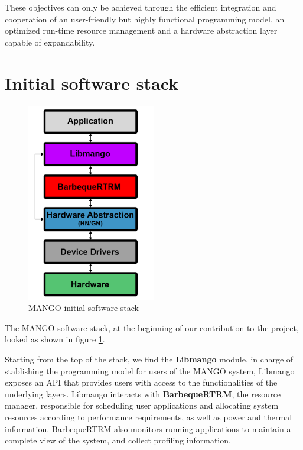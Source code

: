 These objectives can only be achieved through the efficient integration and cooperation of an user-friendly but highly functional programming model, an optimized run-time resource management and a hardware abstraction layer capable of expandability.

\section{Initial software stack}

\begin{figure}[ht]
    \centering
    \includegraphics[width=0.5\textwidth]{img/mango-initial-stack.png}
    \captionsetup{justification=centering}
    \caption{MANGO initial software stack}
    \label{fig:mango_initial_stack}
\end{figure}
 
The MANGO software stack, at the beginning of our contribution to the project, looked as shown in figure \ref{fig:mango_initial_stack}.

Starting from the top of the stack, we find the \textbf{Libmango} module, in charge of stablishing the programming model for users of the MANGO system, Libmango exposes an API that provides users with access to the functionalities of the underlying layers. 
Libmango interacts with \textbf{BarbequeRTRM}, the resource manager, responsible for scheduling user applications and allocating system resources according to performance requirements, as well as power and thermal information. BarbequeRTRM also monitors running applications to maintain a complete view of the system, and collect profiling information.

